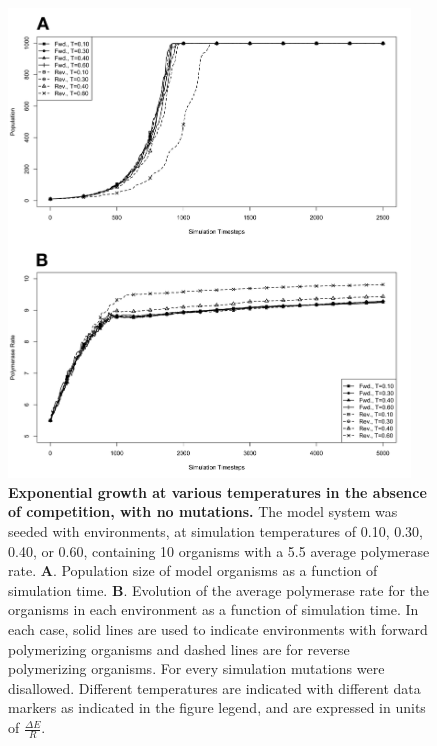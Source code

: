 \begin{figure}[!ht]
	\begin{center}
		\includegraphics[width=0.95\textwidth]{temp_incr_nomut}
	\end{center}
	\caption{
	{\bf Exponential growth at various temperatures in the absence of competition, with no mutations.}  The model system was seeded with environments, at simulation temperatures of 0.10, 0.30, 0.40, or 0.60, containing 10 organisms with a 5.5 average polymerase rate. \textbf{A}. Population size of model organisms as a function of simulation time. \textbf{B}. Evolution of the average polymerase rate for the organisms in each environment as a function of simulation time. In each case, solid lines are used to indicate environments with forward polymerizing organisms and dashed lines are for reverse polymerizing organisms. For every simulation mutations were disallowed. Different temperatures are indicated with different data markers as indicated in the figure legend, and are expressed in units of $\frac{\Delta E}{R}$.
	}
	\label{fig:temp_incr_nomut}
\end{figure}


